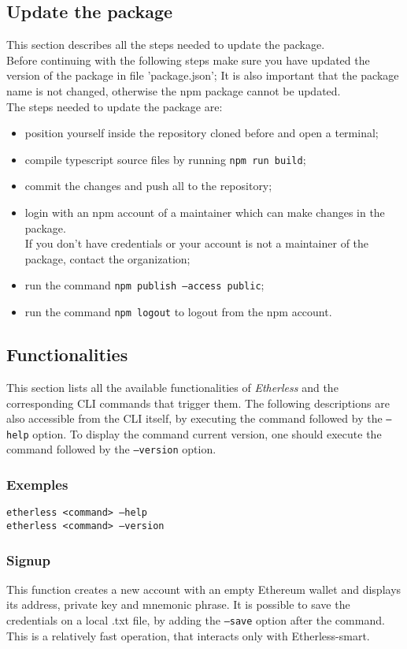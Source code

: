 \subsection{Update the package}
	This section describes all the steps needed to update the package. \\
	Before continuing with the following steps make sure you have updated the version of the package in file 'package.json';
	It is also important that the package name is not changed, otherwise the npm package cannot be updated. \\
	The steps needed to update the package are:
	\begin{itemize}
		\item position yourself inside the repository cloned before and open a terminal;
		\item compile typescript source files by running \texttt{npm run build};
		\item commit the changes and push all to the repository;
		\item login with an npm account of a maintainer which can make changes in the package. \\
			  If you don't have credentials or your account is not a maintainer of the package, contact the organization;
		\item run the command \texttt{npm publish --access public};
		\item run the command \texttt{npm logout} to logout from the npm account.
	\end{itemize}

\subsection{Functionalities}
	This section lists all the available functionalities of \textit{Etherless} and the corresponding CLI commands that trigger them. The following descriptions are also accessible from the CLI itself, by executing the command followed by the \texttt{---help} option. To display the command current version, one should execute the command followed by the \texttt{---version} option.
	\subsubsection*{Exemples}
	\texttt{etherless <command> ---help} \\
	\texttt{etherless <command> ---version}
	\subsubsection{Signup}
	This function creates a new account with an empty Ethereum wallet and displays its address, private key and mnemonic phrase. It is possible to save the credentials on a local .txt file, by adding the \texttt{---save} option after the command. This is a relatively fast operation, that interacts only with Etherless-smart.
